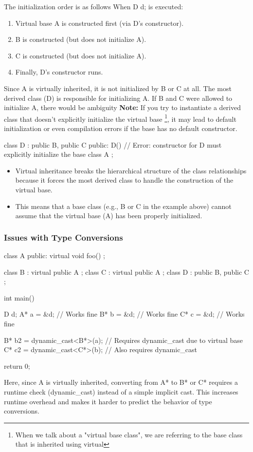 \documentclass{report}
\begin{document}
\bigbreak \noindent 
The initialization order is as follows
\bigbreak \noindent 
When D d; is executed:
\begin{enumerate}
    \item Virtual base A is constructed first (via D's constructor).
    \item B is constructed (but does not initialize A).
    \item C is constructed (but does not initialize A).
    \item Finally, D's constructor runs.
\end{enumerate}
\bigbreak \noindent 
Since A is virtually inherited, it is not initialized by B or C at all. The most derived class (D) is responsible for initializing A. If B and C were allowed to initialize A, there would be ambiguity
\bigbreak \noindent 
\textbf{Note:} If you try to instantiate a derived class that doesn’t explicitly initialize the virtual base \footnote{When we talk about a "virtual base class", we are referring to the base class that is inherited using virtual}, it may lead to default initialization or even compilation errors if the base has no default constructor.
\bigbreak \noindent 
\begin{cppcode}
class D : public B, public C {
public:
    D() {}  // Error: constructor for D must explicitly initialize the base class A
};
\end{cppcode}
\bigbreak \noindent 
\begin{itemize}
    \item Virtual inheritance breaks the hierarchical structure of the class relationships because it forces the most derived class to handle the construction of the virtual base.
    \item This means that a base class (e.g., B or C in the example above) cannot assume that the virtual base (A) has been properly initialized.
\end{itemize}

\bigbreak \noindent 
\subsubsection{Issues with Type Conversions}
\bigbreak \noindent 
\begin{cppcode}
class A {
public:
    virtual void foo() {}
};

class B : virtual public A {};
class C : virtual public A {};
class D : public B, public C {};

int main() {
    D d;
    A* a = &d;  // Works fine
    B* b = &d;  // Works fine
    C* c = &d;  // Works fine

    B* b2 = dynamic_cast<B*>(a);  // Requires dynamic_cast due to virtual base
    C* c2 = dynamic_cast<C*>(b);  // Also requires dynamic_cast

    return 0;
}
\end{cppcode}
\bigbreak \noindent 
Here, since A is virtually inherited, converting from A* to B* or C* requires a runtime check (dynamic_cast) instead of a simple implicit cast.
\bigbreak \noindent 
This increases runtime overhead and makes it harder to predict the behavior of type conversions.
\end{document}
